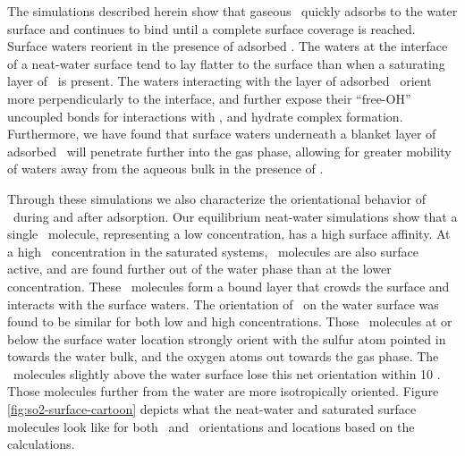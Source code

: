 The simulations described herein show that gaseous \suldiox~quickly adsorbs to the water surface and continues to bind until a complete surface coverage is reached. Surface waters reorient in the presence of adsorbed \suldiox. The waters at the interface of a neat-water surface tend to lay flatter to the surface than when a saturating layer of \suldiox~is present. The waters interacting with the layer of adsorbed \suldiox~orient more perpendicularly to the interface, and further expose their ``free-OH'' uncoupled bonds for interactions with \suldiox, and hydrate complex formation. Furthermore, we have found that surface waters underneath a blanket layer of adsorbed \suldiox~will penetrate further into the gas phase, allowing for greater mobility of waters away from the aqueous bulk in the presence of \suldiox.

Through these simulations we also characterize the orientational behavior of \suldiox~during and after adsorption. Our equilibrium neat-water simulations show that a single \suldiox~molecule, representing a low concentration, has a high surface affinity. At a high \suldiox~concentration in the saturated systems, \suldiox~molecules are also surface active, and are found further out of the water phase than at the lower concentration. These \suldiox~molecules form a bound layer that crowds the surface and interacts with the surface waters. The orientation of \suldiox~on the water surface was found to be similar for both low and high concentrations. Those \suldiox~molecules at or below the surface water location strongly orient with the sulfur atom pointed in towards the water bulk, and the oxygen atoms out towards the gas phase. The \suldiox~molecules slightly above the water surface lose this net orientation within 10 \angs. Those  molecules further from the water are more isotropically oriented. Figure \ref{fig:so2-surface-cartoon} depicts what the neat-water and saturated surface molecules look like for both \suldiox~and \wat~orientations and locations based on the calculations.


